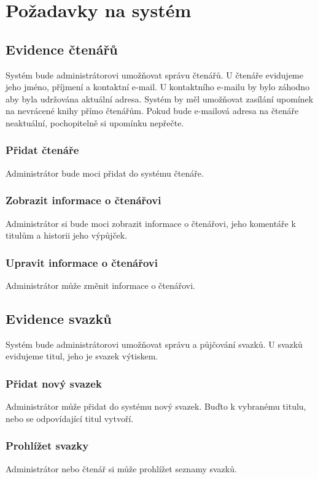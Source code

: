 \documentclass{article}
\begin{document}
\section{Požadavky na systém}
\subsection{Evidence čtenářů}
Systém bude administrátorovi umožňovat správu čtenářů. U čtenáře evidujeme jeho
jméno, příjmení a kontaktní e-mail.
U kontaktního e-mailu by bylo záhodno aby byla udržována aktuální adresa. Systém
by měl umožňovat zasílání upomínek na nevrácené knihy přímo čtenářům. Pokud bude
e-mailová adresa na čtenáře neaktuální, pochopitelně si upomínku nepřečte.

\subsubsection{Přidat čtenáře}
Administrátor bude moci přidat do systému čtenáře.

\subsubsection{Zobrazit informace o čtenářovi}
Administrátor si bude moci zobrazit informace o čtenářovi, jeho komentáře k
titulům a historii jeho výpůjček.

\subsubsection{Upravit informace o čtenářovi}
Administrátor může změnit informace o čtenářovi.


\subsection{Evidence svazků}
Systém bude administrátorovi umožňovat správu a půjčování svazků. U svazků
evidujeme titul, jeho je svazek výtiskem.

\subsubsection{Přidat nový svazek}
Administrátor může přidat do systému nový svazek. Buďto k vybranému titulu, nebo
se odpovídající titul vytvoří.

\subsubsection{Prohlížet svazky}
Administrátor nebo čtenář si může prohlížet seznamy svazků.
\end{document}

